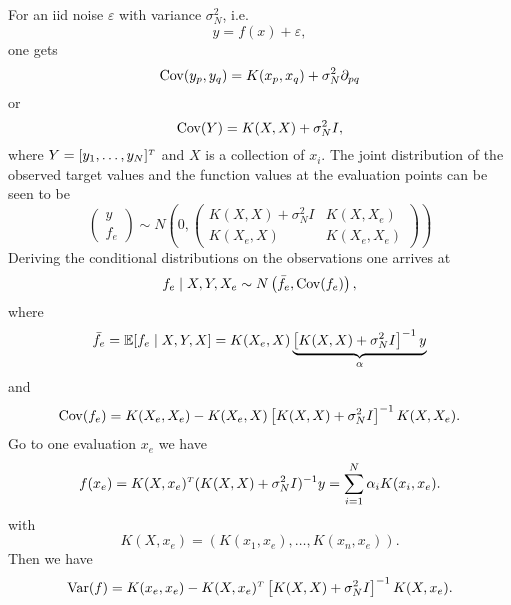 \documentclass[../lecture-notes.tex]{subfiles}
\begin{document}
For an \ac{iid} noise $\varepsilon$ with variance $\sigma_N^2$, i.e.
\[
	y = f(x) + \varepsilon,
\]
one gets
\[
	\operatorname{Cov} (y_p, y_q) = K(x_p, x_q) + \sigma_N^2 \partial_{pq}
\]
or
\[
	\operatorname{Cov}(Y) = K(X, X) + \sigma_N^2 I,
\]
where $Y = [y_1, \ldots, y_N]^\tp$ and $X$ is a collection of $x_i$.
The joint distribution of the observed target values and the function values at the evaluation points can be seen to be
\[
	\begin{pmatrix}
	y \\ f_e
	\end{pmatrix} \sim N \left( 0, \begin{pmatrix}
		K(X, X) + \sigma_N^2 I & K(X, X_e) \\
		K(X_e, X) & K(X_e, X_e)
	\end{pmatrix} \right)
\]
Deriving the conditional distributions on the observations one arrives at
\[
	f_e \mid X, Y, X_e \sim N\left(\bar{f}_e, \operatorname{Cov}(f_e) \right),
\]
where
\[
	\bar{f}_e = \mathbb{E} [f_e \mid X, Y, X ] = K(X_e, X)\underbrace{ \left[ K(X, X) + \sigma_N^2 I \right]^{-1} y}_{\alpha}
\]
and
\[
	\operatorname{Cov}(f_e) = K(X_e, X_e) - K(X_e, X) \left[ K(X, X) + \sigma_N^2 I \right]^{-1} K(X, X_e).
\]
Go to one evaluation $x_e$ we have
\[
	f(x_e) = K(X, x_e)^\tp (K(X, X) + \sigma_N^2 I)^{-1} y = \sum_{i=1}^N \alpha_i K(x_i, x_e).
\]
with
\[
	K(X, x_e) = (K(x_1, x_e), \ldots, K(x_n, x_e)).
\]
Then we have
\[
	\Var(f) = K(x_e, x_e) - K(X, x_e)^\tp \left[ K(X, X) + \sigma_N^2 I \right]^{-1} K(X, x_e).
\]
\end{document}

